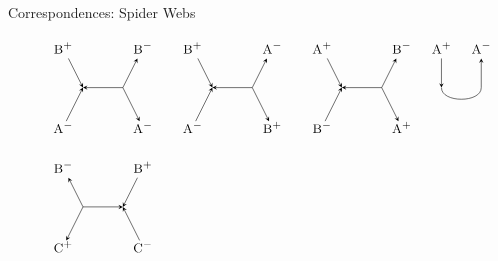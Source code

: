 \documentclass{beamer}
\begin{document}
\begin{frame}{Correspondences: Spider Webs}
\begin{figure}[h!]
\[\begin{tikzpicture}
			\node (i21) at (.5,-3) {$\textsc{\small B}^+$};
			\node (ii21) at (2.5,-3) {$\textsc{\small B}^-$};
			\node (d21) at (1,-4) {};
			\node (dd21) at (2,-4) {};
			\node (o21) at (.5,-5) {$\textsc{\small A}^-$};
			\node (oo21) at (2.5,-5) {$\textsc{\small A}^-$};
			\draw[->,>=stealth] (i21) -- (d21.center);
			\draw[<-,>=stealth] (ii21) -- (dd21.center);
			\draw[<-,>=stealth] (d21.center) -- (dd21.center);
			\draw[<-,>=stealth, shorten >=5pt] (d21.center) -- (o21.center);
			\draw[->,>=stealth, shorten >=5pt] (dd21.center) -- (oo21.center);
			
			\node (i22) at (3.75,-3) {$\textsc{\small B}^+$};
			\node (ii22) at (5.75,-3) {$\textsc{\small A}^-$};
			\node (d22) at (4.25,-4) {};
			\node (dd22) at (5.25,-4) {};
			\node (o22) at (3.75,-5) {$\textsc{\small A}^-$};
			\node (oo22) at (5.75,-5) {$\textsc{\small B}^+$};
			\draw[->,>=stealth] (i22) -- (d22.center);
			\draw[<-,>=stealth] (ii22) -- (dd22.center);
			\draw[<-,>=stealth] (d22.center) -- (dd22.center);
			\draw[<-,>=stealth, shorten >=5pt] (d22.center) -- (o22.center);
			\draw[->,>=stealth, shorten >=5pt] (dd22.center) -- (oo22.center);
			
			\node (i23) at (7,-3) {$\textsc{\small A}^+$};
			\node (ii23) at (9,-3) {$\textsc{\small B}^-$};
			\node (d23) at (7.5,-4) {};
			\node (dd23) at (8.5,-4) {};
			\node (o23) at (7,-5) {$\textsc{\small B}^-$};
			\node (oo23) at (9,-5) {$\textsc{\small A}^+$};
			\draw[->,>=stealth] (i23) -- (d23.center);
			\draw[<-,>=stealth] (ii23) -- (dd23.center);
			\draw[<-,>=stealth] (d23.center) -- (dd23.center);
			\draw[<-,>=stealth, shorten >=5pt] (d23.center) -- (o23.center);
			\draw[->,>=stealth, shorten >=5pt] (dd23.center) -- (oo23.center);
			
			\node (i24) at (10,-3) {$\textsc{\small A}^+$};
			\node (ii24) at (11,-3) {$\textsc{\small A}^-$};
			\node (d24) at (10,-4) {};
			\node (dd24) at (11,-4) {};
			\draw[->,>=stealth] (i24) -- (d24.center);
			\draw[<-,>=stealth] (ii24) -- (dd24.center);
			\draw (d24.center) edge [-,>=stealth,bend right=90] (dd24.center);
			
			\node (i31) at (.5,-6) {$\textsc{\small B}^-$};
			\node (ii31) at (2.5,-6) {$\textsc{\small B}^+$};
			\node (d31) at (1,-7) {};
			\node (dd31) at (2,-7) {};
			\node (o31) at (.5,-8) {$\textsc{\small C}^+$};
			\node (oo31) at (2.5,-8) {$\textsc{\small C}^-$};
			\draw[<-,>=stealth] (i31) -- (d31.center);
			\draw[->,>=stealth] (ii31) -- (dd31.center);
			\draw[->,>=stealth] (d31.center) -- (dd31.center);
			\draw[->,>=stealth, shorten >=5pt] (d31.center) -- (o31.center);
			\draw[<-,>=stealth, shorten >=5pt] (dd31.center) -- (oo31.center);
			

\end{tikzpicture}\]
\end{figure}
\end{frame}
\end{document}
